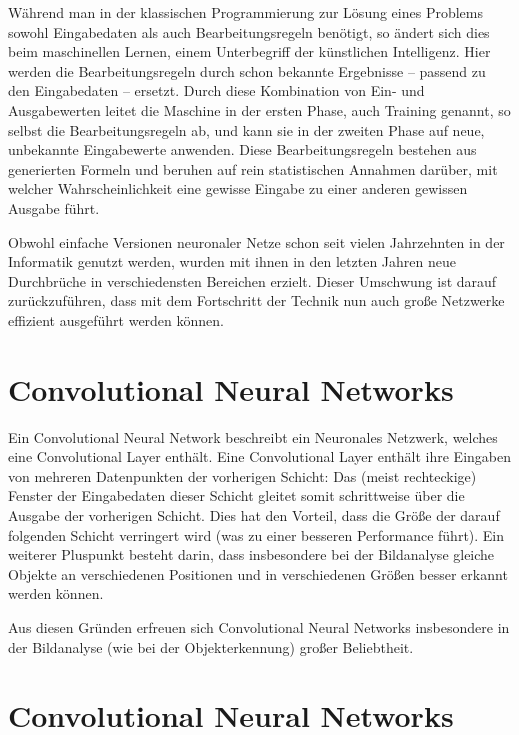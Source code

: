 Während man in der klassischen Programmierung zur Lösung eines Problems sowohl Eingabedaten als auch Bearbeitungsregeln benötigt, so ändert sich dies beim maschinellen Lernen, einem Unterbegriff der künstlichen Intelligenz. Hier werden die Bearbeitungsregeln durch schon bekannte Ergebnisse -- passend zu den Eingabedaten -- ersetzt. Durch diese Kombination von Ein- und Ausgabewerten leitet die Maschine in der ersten Phase, auch Training genannt, so selbst die Bearbeitungsregeln ab, und kann sie in der zweiten Phase auf neue, unbekannte Eingabewerte anwenden. Diese Bearbeitungsregeln bestehen aus generierten Formeln und beruhen auf rein statistischen Annahmen darüber, mit welcher Wahrscheinlichkeit eine gewisse Eingabe zu einer anderen gewissen Ausgabe führt. \cite{deeplearning_18} 



Obwohl einfache Versionen neuronaler Netze schon seit vielen Jahrzehnten in der Informatik genutzt werden, wurden mit ihnen in den letzten Jahren neue Durchbrüche in verschiedensten Bereichen erzielt. Dieser Umschwung ist darauf zurückzuführen, dass mit dem Fortschritt der Technik nun auch große Netzwerke effizient ausgeführt werden können.

\section{Convolutional Neural Networks}
\label{sec:cnn}



Ein Convolutional Neural Network beschreibt ein Neuronales Netzwerk, welches eine Convolutional Layer enthält. Eine Convolutional Layer enthält ihre Eingaben von mehreren Datenpunkten der vorherigen Schicht: Das (meist rechteckige) Fenster der Eingabedaten dieser Schicht gleitet somit schrittweise über die Ausgabe der vorherigen Schicht. \cite{schmidhuber_15} Dies hat den Vorteil, dass die Größe der darauf folgenden Schicht verringert wird (was zu einer besseren Performance führt). Ein weiterer Pluspunkt besteht darin, dass insbesondere bei der Bildanalyse gleiche Objekte an verschiedenen Positionen und in verschiedenen Größen besser erkannt werden können. \cite{szegedy_15}

Aus diesen Gründen erfreuen sich Convolutional Neural Networks insbesondere in der Bildanalyse (wie \zB bei der Objekterkennung) großer Beliebtheit.

\fi

\section{Convolutional Neural Networks}
\label{sec:cnn}

